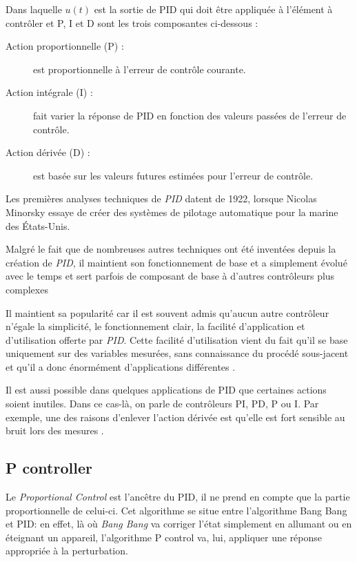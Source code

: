 \documentclass[a4paper,10pt]{report}
\begin{document}
Dans laquelle $u(t)$ est la sortie de PID qui doit être appliquée à l'élément à contrôler et P, I et D sont les trois composantes ci-dessous :
\begin{description}
\item[Action proportionnelle (P) :]
    est proportionnelle à l'erreur de contrôle courante.
\item[Action intégrale (I) :]
    fait varier la réponse de PID en fonction des valeurs passées de l'erreur de contrôle.
\item[Action dérivée (D) :]
    est basée sur les valeurs futures estimées pour l'erreur de contrôle.
\end{description}

Les premières analyses techniques de \emph{PID} datent de 1922, lorsque Nicolas Minorsky essaye de créer des systèmes de pilotage automatique pour la marine des États-Unis. \cite{minorsky1922directional}

Malgré le fait que de nombreuses autres techniques ont été inventées depuis la création de \emph{PID}, il maintient son fonctionnement de base et a simplement évolué avec le temps et sert parfois de composant de base à d'autres contrôleurs plus complexes \cite{ang2005pid} \cite{visioli2006practical}

Il maintient sa popularité car il est souvent admis qu'aucun autre contrôleur n'égale la simplicité, le fonctionnement clair, la facilité d'application et d'utilisation offerte par \emph{PID}. Cette facilité d'utilisation vient du fait qu'il se base uniquement sur des variables mesurées, sans connaissance du procédé sous-jacent et qu'il a donc énormément d'applications différentes \cite{bennett1993history}.

Il est aussi possible dans quelques applications de PID que certaines actions soient inutiles.
Dans ce cas-là, on parle de contrôleurs PI, PD, P ou I.
Par exemple, une des raisons d'enlever l'action dérivée est qu'elle est fort sensible au bruit lors des mesures \cite{svrcek2014real}.

\subsection{P controller}
Le \emph{Proportional Control} est l'ancêtre du PID, il ne prend en compte que la partie proportionnelle de celui-ci.
Cet algorithme se situe entre l'algorithme Bang Bang et PID:
en effet, là où \emph{Bang Bang} va corriger l'état simplement en allumant ou en éteignant un appareil, l'algorithme P control va, lui, appliquer une réponse appropriée à la perturbation.
\end{document}
